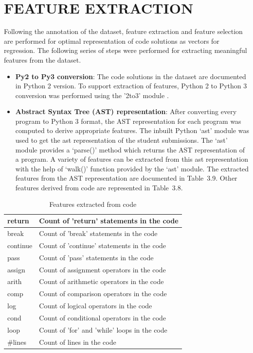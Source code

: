 \newpage

\section{FEATURE EXTRACTION}

Following the annotation of the dataset, feature extraction
and feature selection are performed for optimal
representation of code solutions as vectors for
regression. The following series of steps were performed for
extracting meaningful features from the dataset.

\begin{itemize}
\item \textbf{Py2 to Py3 conversion}: The code solutions in
  the dataset are documented in Python 2 version. To support
  extraction of features, Python 2 to Python 3 conversion was
  performed using the '2to3' module \cite{G}.
\item \textbf{Abstract Syntax Tree (AST) representation}:
  After converting every program to Python 3 format, the AST
  \cite{F} representation for each program was computed to
  derive appropriate features. The inbuilt Python `ast'
  module was used to get the ast representation of the
  student submissions. The `ast' module provides a `parse()'
  method which returns the AST representation of a program. A
  variety of features can be extracted from this ast
  representation with the help of `walk()' function provided
  by the `ast' module. The extracted features from the AST
  representation are documented in Table~3.9. Other features
  derived from code are represented in Table~3.8.
\end{itemize}

\begin{table}[H]
\centering
\caption{Features extracted from code}
\begin{tabular}{|l|l|} 
\hline
return       & Count of 'return' statements in the code      \\ 
\hline
break        & Count of 'break' statements in the code       \\ 
\hline
continue     & Count of 'continue' statements in the code    \\ 
\hline
pass         & Count of 'pass' statements in the code        \\ 
\hline
assign       & Count of assignment operators in the code     \\ 
\hline
arith        & Count of arithmetic operators in the code     \\ 
\hline
comp         & Count of comparison operators in the code     \\ 
\hline
log          & Count of logical operators in the code        \\ 
\hline
cond         & Count of conditional operators in the code    \\ 
\hline
loop         & Count of 'for' and 'while' loops in the code  \\ 
\hline
\#lines      & Count of lines in the code                    \\ 
\hline
\end{tabular}
\end{table}

